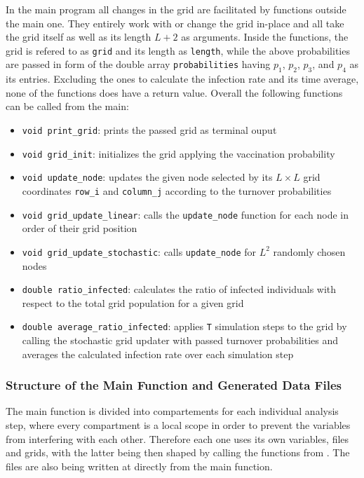 In the main program all changes in the grid are facilitated by functions outside the main one. They entirely work with or change the grid in-place and all take the grid itself as well as its length $L+2$ as arguments.
Inside the functions, the grid is refered to as \texttt{grid} and its length as \texttt{length}, while the above probabilities are passed in form of the double array \texttt{probabilities} having $p_1$, $p_2$, $p_3$, 
and $p_4$ as its entries. Excluding the ones to calculate the infection rate and its time average, none of the functions does have a return value. Overall the following functions can be called from the main:
\begin{itemize}
    \item \texttt{void print\_grid}: prints the passed grid as terminal ouput
    \item \texttt{void grid\_init}: initializes the grid applying the vaccination probability
    \item \texttt{void update\_node}: updates the given node selected by its $L\times L$ grid coordinates \texttt{row\_i} and \texttt{column\_j} according to the turnover probabilities
    \item \texttt{void grid\_update\_linear}: calls the \texttt{update\_node} function for each node in order of their grid position
    \item \texttt{void grid\_update\_stochastic}: calls \texttt{update\_node} for $L^2$ randomly chosen nodes
    \item \texttt{double ratio\_infected}: calculates the ratio of infected individuals with respect to the total grid population for a given grid
    \item \texttt{double average\_ratio\_infected}: applies \texttt{T} simulation steps to the grid by calling the stochastic grid updater with passed turnover probabilities 
    and averages the calculated infection rate over each simulation step
\end{itemize}


\subsubsection{Structure of the Main Function and Generated Data Files}

The main function is divided into compartements for each individual analysis step, where every compartment is a local scope in order to prevent the variables from interfering with each other.
Therefore each one uses its own variables, files and grids, with the latter being then shaped by calling the functions from . The files are also being written at
directly from the main function.

